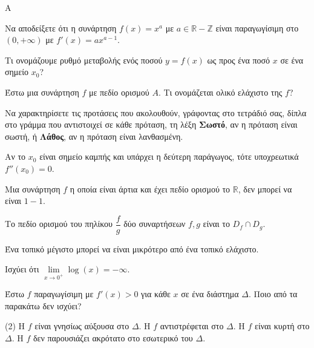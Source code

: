 \begin{thema}{A}
\begin{erwthma}
    \item Να αποδείξετε ότι η συνάρτηση $ f(x)=x^a $ με $ a\in\mathbb{R}-\mathbb{Z} $ είναι παραγωγίσιμη στο $ (0,+\infty) $ με $ f'(x)=ax^{a-1} $.
    \item Τι ονομάζουμε ρυθμό μεταβολής ενός ποσού $y=f(x)$ ως προς ένα ποσό $x$ σε ένα σημείο $x_0$?
    \item Έστω μια συνάρτηση $f$ με πεδίο ορισμού $A$. Τι ονομάζεται ολικό ελάχιστο της $f$?
    \item Να χαρακτηρίσετε τις προτάσεις που ακολουθούν, γράφοντας στο τετράδιό σας, δίπλα στο γράμμα που αντιστοιχεί σε κάθε πρόταση, τη λέξη \textbf{Σωστό}, αν η πρόταση είναι σωστή, ή \textbf{Λάθος}, αν η πρόταση είναι λανθασμένη.
    \begin{alist}
        \item Αν το $x_0$ είναι σημείο καμπής και υπάρχει η δεύτερη παράγωγος, τότε υποχρεωτικά $f''(x_0) = 0$.
        \item Μια συνάρτηση $f$ η οποία είναι άρτια και έχει πεδίο ορισμού το $\mathbb{R}$, δεν μπορεί να είναι $1-1$.
        \item Το πεδίο ορισμού του πηλίκου $\dfrac{f}{g}$ δύο συναρτήσεων $f,g$ είναι το $D_f\cap D_g$.
        \item Ένα τοπικό μέγιστο μπορεί να είναι μικρότερο από ένα τοπικό ελάχιστο.
        \item Ισχύει ότι $\lim\limits_{x\to0^+}\log(x)=-\infty$.
    \end{alist}
    \item Έστω $f$ παραγωγίσιμη με $f'(x) > 0$ για κάθε $x$ σε ένα διάστημα $\Delta$. Ποιο από τα παρακάτω δεν ισχύει?
    \begin{tasks}[label=\let\textdexiakeraia\relax\alph*.](2)
        \task Η $f$ είναι γνησίως αύξουσα στο $\Delta$.
        \task Η $f$ αντιστρέφεται στο $\Delta$.
        \task Η $f$ είναι κυρτή στο $\Delta$.
        \task Η $f$ δεν παρουσιάζει ακρότατο στο εσωτερικό του $\Delta$.
    \end{tasks}
\end{erwthma}
\end{thema}
